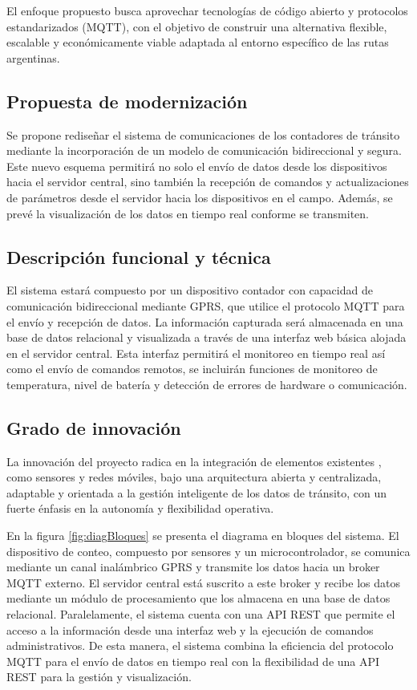 \documentclass[
11pt, %
]{charter}
\begin{document}
El enfoque propuesto busca aprovechar tecnologías de código abierto y protocolos estandarizados (MQTT), con el objetivo de construir una alternativa flexible, escalable y económicamente viable adaptada al entorno específico de las rutas argentinas.
\subsection{Propuesta de modernización}

Se propone rediseñar el sistema de comunicaciones de los contadores de tránsito mediante la incorporación de un modelo de comunicación bidireccional y segura.
Este nuevo esquema permitirá no solo el envío de datos desde los dispositivos hacia el servidor central, sino también la recepción de comandos y actualizaciones de parámetros desde el servidor hacia los dispositivos en el campo.
Además, se prevé la visualización de los datos en tiempo real conforme se transmiten.

\subsection{Descripción funcional y técnica}

El sistema estará compuesto por un dispositivo contador con capacidad de comunicación bidireccional mediante GPRS, que utilice el protocolo MQTT para el envío y recepción de datos. La información capturada será almacenada en una base de datos relacional y visualizada a través de una interfaz web básica alojada en el servidor central. Esta interfaz permitirá el monitoreo en tiempo real así como el envío de comandos remotos, se incluirán funciones de monitoreo de temperatura, nivel de batería y detección de errores de hardware o comunicación.


\subsection{Grado de innovación}
La innovación del proyecto radica en la integración de elementos existentes , como sensores y redes móviles, bajo una arquitectura abierta y centralizada, adaptable y orientada a la gestión inteligente de los datos de tránsito, con un fuerte énfasis en la autonomía y flexibilidad operativa.


En la figura \ref{fig:diagBloques} se presenta el diagrama en bloques del sistema. El dispositivo de conteo, compuesto por sensores y un microcontrolador, se comunica mediante un canal inalámbrico GPRS y transmite los datos hacia un broker MQTT externo. El servidor central está suscrito a este broker y recibe los datos mediante un módulo de procesamiento que los almacena en una base de datos relacional. Paralelamente, el sistema cuenta con una API REST que permite el acceso a la información desde una interfaz web y la ejecución de comandos administrativos. De esta manera, el sistema combina la eficiencia del protocolo MQTT para el envío de datos en tiempo real con la flexibilidad de una API REST para la gestión y visualización.
\end{document}
